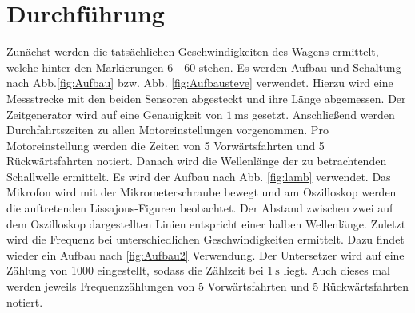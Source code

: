 
\section{Durchführung}
\label{sec:Durchführung}

\renewcommand{\labelenumi}{\alph{enumi})}
Zunächst werden die tatsächlichen Geschwindigkeiten des Wagens ermittelt, welche
 hinter den Markierungen 6 - 60 stehen. Es werden Aufbau und Schaltung nach Abb.\ref{fig:Aufbau} bzw. Abb. \ref{fig:Aufbausteve} verwendet. Hierzu wird eine Messstrecke mit den
  beiden Sensoren abgesteckt und ihre Länge abgemessen. Der Zeitgenerator wird auf eine Genauigkeit von $\SI{1}{\milli\second}$ gesetzt. Anschließend werden
   Durchfahrtszeiten zu allen Motoreinstellungen vorgenommen. Pro Motoreinstellung
    werden die Zeiten von 5 Vorwärtsfahrten und 5 Rückwärtsfahrten notiert. Danach
     wird die Wellenlänge der zu betrachtenden Schallwelle ermittelt. Es wird der Aufbau nach Abb. \ref{fig:lamb} verwendet.
      Das Mikrofon wird mit der Mikrometerschraube bewegt und am Oszilloskop werden
       die auftretenden Lissajous-Figuren beobachtet. Der Abstand zwischen zwei
        auf dem Oszilloskop dargestellten Linien entspricht einer halben Wellenlänge.
         Zuletzt wird die Frequenz bei unterschiedlichen Geschwindigkeiten ermittelt.
          Dazu findet wieder ein Aufbau nach \ref{fig:Aufbau2} Verwendung. Der
          Untersetzer wird auf eine Zählung von 1000 eingestellt, sodass die Zählzeit bei $\SI{1}{\second}$ liegt.
          Auch dieses mal werden jeweils Frequenzzählungen von 5 Vorwärtsfahrten und 5 Rückwärtsfahrten notiert.
